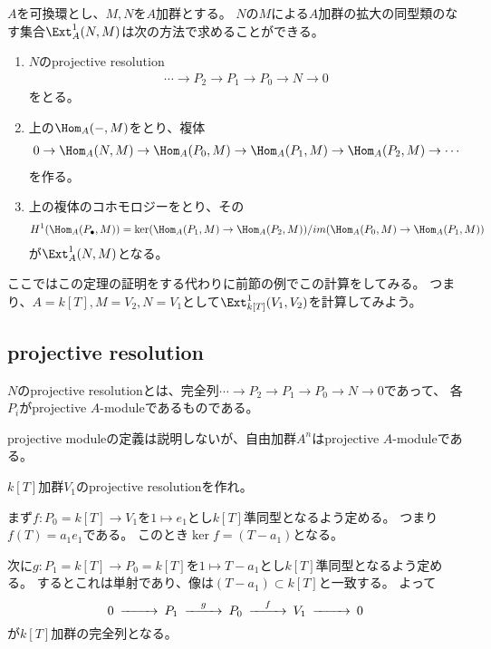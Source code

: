 \documentclass{jsarticle}
\begin{document}
\begin{thm}
$A$を可換環とし、$M, N$を$A$加群とする。
$N$の$M$による$A$加群の拡大の同型類のなす集合$\Ext^1_A(N,M)$は次の方法で求めることができる。
\begin{enumerate}
\item $N$のprojective resolution
\begin{align*}
\cdots \to P_2 \to P_1 \to P_0 \to N \to 0
\end{align*}
をとる。
\item 上の$\Hom_A(-,M)$をとり、複体
\begin{align*}
0 \to \Hom_A(N,M) \to \Hom_A(P_0,M) \to \Hom_A(P_1,M) \to \Hom_A(P_2,M) \to \cdots
\end{align*}
を作る。
\item 上の複体のコホモロジーをとり、その
\begin{align*}
H^1(\Hom_A(P_\bullet,M))=\ker(\Hom_A(P_1,M) \to \Hom_A(P_2,M))/im(\Hom_A(P_0,M) \to \Hom_A(P_1,M))
\end{align*}
が$\Ext^1_A(N,M)$となる。
\end{enumerate}
\end{thm}
ここではこの定理の証明をする代わりに前節の例でこの計算をしてみる。
つまり、$A=k[T], M=V_2, N=V_1$として$\Ext^1_{k[T]}(V_1, V_2)$を計算してみよう。

\subsection{projective resolution}
\begin{dfn}
$N$のprojective resolutionとは、完全列$\cdots \to P_2 \to P_1 \to P_0 \to N \to 0$であって、
各$P_i$がprojective $A$-moduleであるものである。
\end{dfn}
projective moduleの定義は説明しないが、自由加群$A^n$はprojective $A$-moduleである。

\begin{prob}
$k[T]$加群$V_1$のprojective resolutionを作れ。
\end{prob}
まず$f\colon P_0=k[T] \to V_1$を$1 \mapsto e_1$とし$k[T]$準同型となるよう定める。
つまり$f(T)=a_1e_1$である。
このとき$\ker f=(T-a_1)$となる。

次に$g:P_1=k[T] \to P_0=k[T]$を$1\mapsto T-a_1$とし$k[T]$準同型となるよう定める。
するとこれは単射であり、像は$(T-a_1)\subset k[T]$と一致する。
よって
\[
\begin{CD}
0 @>>> P_1 @>g>> P_0 @>f>> V_1 @>>> 0\\
\end{CD}
\]
が$k[T]$加群の完全列となる。
\end{document}
